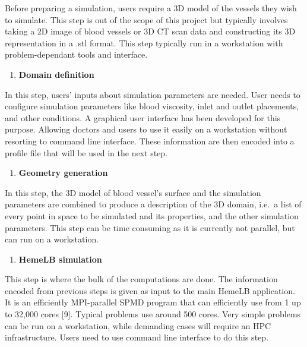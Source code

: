 \documentclass[]{article}
\providecommand{\tightlist}{%
  \setlength{\itemsep}{0pt}\setlength{\parskip}{0pt}}
\begin{document}
Before preparing a simulation, users require a 3D model of the vessels
they wish to simulate. This step is out of the scope of this project but
typically involves taking a 2D image of blood vessels or 3D CT scan data
and constructing its 3D representation in a .stl format. This step
typically run in a workstation with problem-dependant tools and
interface.

\begin{enumerate}
\def\labelenumi{\arabic{enumi}.}
\setcounter{enumi}{1}
\tightlist
\item
  \textbf{Domain definition}
\end{enumerate}

In this step, users' inputs about simulation parameters are needed. User
needs to configure simulation parameters like blood viscosity, inlet and
outlet placements, and other conditions. A graphical user interface has
been developed for this purpose. Allowing doctors and users to use it
easily on a workstation without resorting to command line interface.
These information are then encoded into a profile file that will be used
in the next step.

\begin{enumerate}
\def\labelenumi{\arabic{enumi}.}
\setcounter{enumi}{2}
\tightlist
\item
  \textbf{Geometry generation}
\end{enumerate}

In this step, the 3D model of blood vessel's surface and the simulation
parameters are combined to produce a description of the 3D domain,
i.e.~a list of every point in space to be simulated and its properties,
and the other simulation parameters. This step can be time consuming as
it is currently not parallel, but can run on a workstation.

\begin{enumerate}
\def\labelenumi{\arabic{enumi}.}
\setcounter{enumi}{3}
\tightlist
\item
  \textbf{HemeLB simulation}
\end{enumerate}

This step is where the bulk of the computations are done. The
information encoded from previous steps is given as input to the main
HemeLB application. It is an efficiently MPI-parallel SPMD program that
can efficiently use from 1 up to 32,000 cores {[}9{]}. Typical problems
use around 500 cores. Very simple problems can be run on a workstation,
while demanding cases will require an HPC infrastructure. Users need to
use command line interface to do this step.
\end{document}
